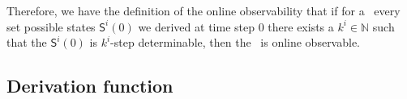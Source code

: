 Therefore, we have the definition of the online observability that if for a \BCN\ every set possible states $\mathsf{S}^{i}(0)$ we derived at time step $0$ there exists a $k^i\in \mathbb{N}$ such that the $\mathsf{S}^{i}(0)$ is $k^i$-step determinable, then the \BCN\ is online observable.

\subsection{Derivation function}

